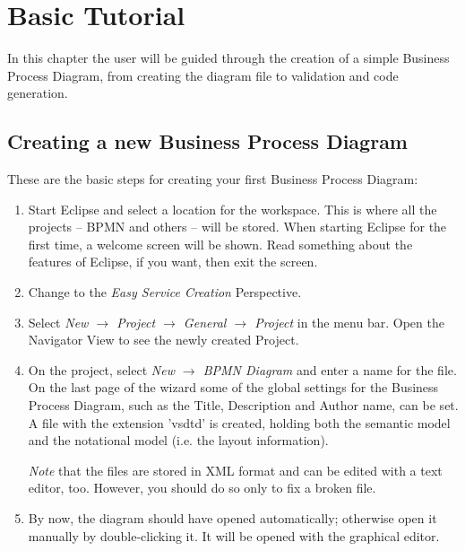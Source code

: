 \chapter{Basic Tutorial}
\label{sec:user_tut}

In this chapter the user will be guided through the creation of a simple Business Process Diagram,
from creating the diagram file to validation and code generation.


\section{Creating a new Business Process Diagram}
\label{sec:user_tut_new}

These are the basic steps for creating your first Business Process Diagram:

\begin{enumerate}
	
	\item Start Eclipse and select a location for the workspace. This is where all the projects --
	BPMN and others -- will be stored. When starting Eclipse for the first time, a welcome screen
	will be shown. Read something about the features of Eclipse, if you want, then exit the screen.
	
	\item Change to the \emph{Easy Service Creation} Perspective.
	
	\item Select \emph{ New $\rightarrow$ Project $\rightarrow$ General $\rightarrow$ Project } in
	the menu bar. Open the Navigator View to see the newly created Project.
	
	\item On the project, select \emph{New $\rightarrow$ BPMN Diagram} and enter a name for the
	file. On the last page of the wizard some of the global settings for the Business Process
	Diagram, such as the Title, Description and Author name, can be set. A file with the extension
	'vsdtd' is created, holding both the semantic model and the notational model (i.e. the layout
	information).
	
	\emph{Note} that the files are stored in XML format and can be edited with a text editor, too.
	However, you should do so only to fix a broken file.
	
	\item By now, the diagram should have opened automatically; otherwise open it manually by
	double-clicking it. It will be opened with the graphical editor. 

\end{enumerate}


